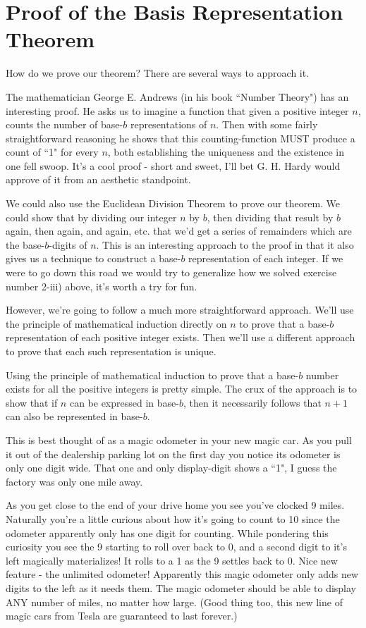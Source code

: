 \documentclass{article}
\begin{document}
\section*{Proof of the Basis Representation Theorem}
How do we prove our theorem? There are several ways to approach it.

The mathematician George E. Andrews (in his book
``Number Theory") has an interesting proof.
He asks us to imagine a function that given a positive integer $n$,
counts the number of base-$b$ representations of $n$.
Then with some fairly straightforward reasoning he shows that this counting-function
MUST produce a count of ``1" for every $n$, both establishing the uniqueness 
and the existence in one fell swoop.
It's a cool proof - short and sweet, I'll bet G. H. Hardy would approve of
it from an aesthetic standpoint.

We could also use the Euclidean Division Theorem to prove our theorem.
We could show that by dividing our integer $n$ by $b$, then dividing that
result by $b$ again, then again, and again, etc. that we'd get a series
of remainders which are the base-$b$-digits of $n$.
This is an interesting approach to the proof in that it also gives us a technique
to construct a base-$b$ representation of each integer.
If we were to go down this road
we would try to generalize how we solved
exercise number 2-iii) above, it's worth a try for fun.

However, we're going to follow a much more straightforward approach.
We'll use the principle of mathematical induction directly on $n$
to prove that
a base-$b$ representation of each positive integer exists.
Then we'll use a different approach to prove that each such representation is unique.

\bigskip
Using the
principle of mathematical induction 
to prove that a base-$b$ number exists for all the positive integers is pretty simple.
The crux of the approach is to show that if $n$ can be expressed in base-$b$,
then it necessarily follows that $n+1$ can also be represented in base-$b$.

This is best thought of as a magic
odometer in your new magic car.
As you pull it out of the dealership parking lot
on the first day you notice its odometer is only one digit wide.
That one and only display-digit shows a ``1", I guess the factory was only one mile away.

As you get close to the end of your drive home
you see you've clocked 9 miles.
Naturally you're a little curious about how it's going to
count to 10 since the odometer apparently only has one digit for counting.
While pondering this curiosity you see the 9 starting to roll
over back to 0, and a second digit to it's left magically materializes!
It rolls to a 1 as the 9 settles back to 0.
Nice new feature - the unlimited odometer!
Apparently this magic odometer only adds new digits to the left
as it needs them.
The magic odometer should be able to display ANY number of miles, no matter how large.
(Good thing too, this
new line of magic cars from Tesla are guaranteed to last forever.)
\end{document}
